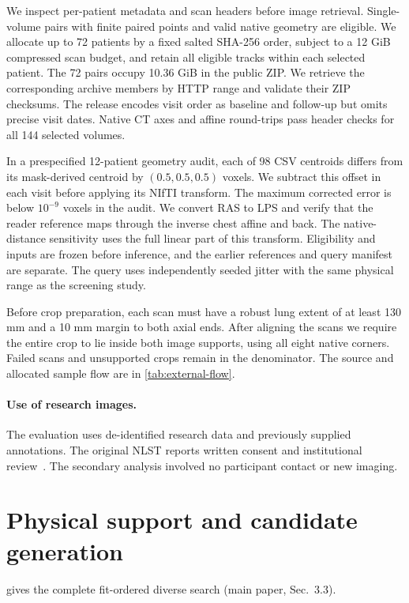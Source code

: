We inspect per-patient metadata and scan headers before image retrieval. Single-volume pairs with finite paired points and valid native geometry are eligible. We allocate up to 72 patients by a fixed salted SHA-256 order, subject to a 12 GiB compressed scan budget, and retain all eligible tracks within each selected patient. The 72 pairs occupy 10.36 GiB in the public ZIP. We retrieve the corresponding archive members by HTTP range and validate their ZIP checksums. The release encodes visit order as baseline and follow-up but omits precise visit dates. Native CT axes and affine round-trips pass header checks for all 144 selected volumes.

In a prespecified 12-patient geometry audit, each of 98 CSV centroids differs from its mask-derived centroid by $(0.5,0.5,0.5)$ voxels. We subtract this offset in each visit before applying its NIfTI transform. The maximum corrected error is below $10^{-9}$ voxels in the audit. We convert RAS to LPS and verify that the reader reference maps through the inverse chest affine and back. The native-distance sensitivity uses the full linear part of this transform. Eligibility and inputs are frozen before inference, and the earlier references and query manifest are separate. The query uses independently seeded jitter with the same physical range as the screening study.

Before crop preparation, each scan must have a robust lung extent of at least 130 mm and a 10 mm margin to both axial ends. After aligning the scans we require the entire crop to lie inside both image supports, using all eight native corners. Failed scans and unsupported crops remain in the denominator. The source and allocated sample flow are in \cref{tab:external-flow}.

\paragraph{Use of research images.}
The evaluation uses de-identified research data and previously supplied annotations. The original NLST reports written consent and institutional review~\cite{aberlenslt}. The secondary analysis involved no participant contact or new imaging.

\section{Physical support and candidate generation}
 gives the complete fit-ordered diverse search (main paper, Sec.~3.3).


